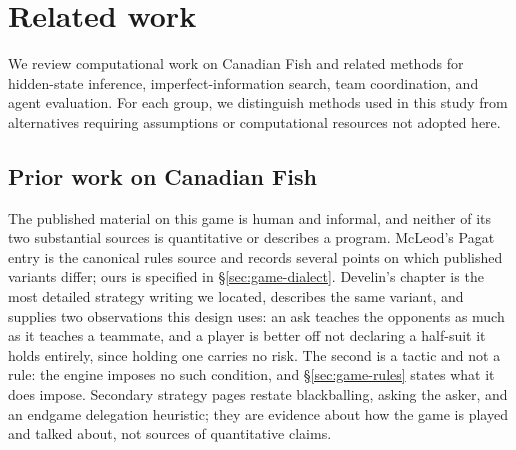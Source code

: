 \section{Related work}
\label{sec:related}

We review computational work on Canadian Fish and related methods for hidden-state inference,
imperfect-information search, team coordination, and agent evaluation. For each group, we
distinguish methods used in this study from alternatives requiring assumptions or computational
resources not adopted here.

\subsection{Prior work on Canadian Fish}
\label{sec:related-fish}

The published material on this game is human and informal, and neither of its two substantial
sources is quantitative or describes a program. McLeod's Pagat entry \cite{pagat} is the canonical
rules source and records several points on which published variants differ; ours is specified in
\S\ref{sec:game-dialect}. Develin's chapter \cite{develin} is the most detailed strategy writing we
located, describes the same variant, and supplies two observations this design uses: an ask teaches
the opponents as much as it teaches a teammate, and a player is better off not declaring a half-suit
it holds entirely, since holding one carries no risk. The second is a tactic and not a rule: the
engine imposes no such condition, and \S\ref{sec:game-rules} states what it does impose. Secondary strategy pages \cite{dorsa,strategy-site,wikiliterature} restate blackballing,
asking the asker, and an endgame delegation heuristic; they are evidence about how the game is
played and talked about, not sources of quantitative claims.

